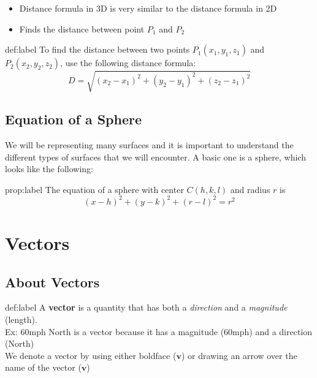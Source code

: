 \documentclass{package/notes}
\begin{document}
\begin{itemize}
	\item Distance formula in 3D is very similar to the distance formula in 2D
	\item Finds the distance between point $P_1$ and $P_2$ 
\end{itemize}

\newpage
\begin{definition}{def:label}
	To find the distance between two points $P_1(x_1, y_1, z_1)$ and $P_2(x_2,y_2,z_2)$, use the following distance formula:
	$$D = \sqrt{(x_2-x_1)^2 + (y_2-y_1)^2 + (z_2-z_1)^2}$$
\end{definition}

\subsection{Equation of a Sphere}
	
We will be representing many surfaces and it is important to understand the different types of surfaces that we will encounter. A basic one is a sphere, which looks like the following:
	
\begin{proposition}{prop:label}
The equation of a sphere with center $C(h,k,l)$ and radius $r$ is
$$(x-h)^2 + (y-k)^2 + (r-l)^2 = r^2$$
\end{proposition}


\section{Vectors}

\subsection{About Vectors}

\begin{definition}[Vectors]{def:label}
	A \textbf{vector} is a quantity that has both a \textit{direction} and a \textit{magnitude} (length).\\

	Ex: 60mph North is a vector because it has a magnitude (60mph) and a direction (North)\\

	We denote a vector by using either boldface ($\mathbf v$) or drawing an arrow over the name of the vector ($\mathbf v$)
\end{definition}
\end{document}
